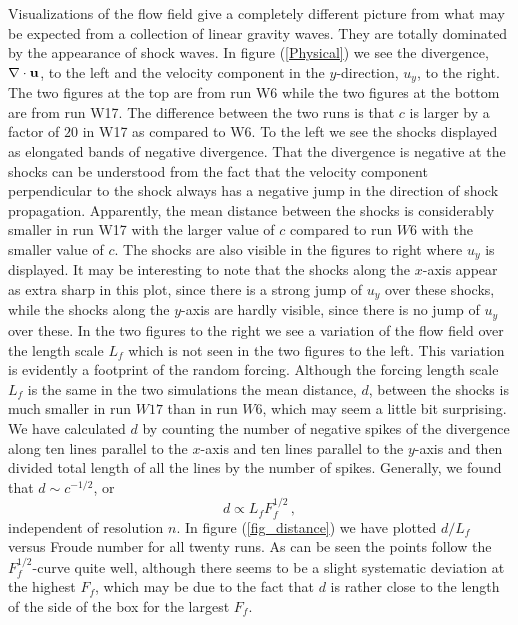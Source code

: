 Visualizations of the flow field give a completely different picture from what
may be expected from a collection of linear gravity waves. They are totally
dominated by the appearance of shock waves. In figure (\ref{Physical}) we see
the divergence, $ \nabla \cdot {\bf u} $, to the left and the velocity
component in the $ y $-direction, $ u_y $, to the right. The two figures at the
top are from run W6 while the two figures at the bottom are from run W17. The
difference between the two runs is that $ c $ is larger by a factor of $ 20 $
in W17 as compared to W6. To the left we see the shocks displayed as elongated
bands of negative divergence. That the divergence is negative at the shocks can
be understood from the fact that the velocity component perpendicular to the
shock always has a negative jump in the direction of shock propagation.
Apparently, the mean distance between the shocks is considerably smaller in run
W17 with the larger value of $ c $ compared to run $ W6 $ with the smaller
value of $ c $. The shocks are also visible in the figures to right where $ u_y
$ is displayed. It may be interesting to note that the shocks along the $ x
$-axis appear as extra sharp in this plot, since there is a strong jump of $
u_{y} $ over these shocks, while the shocks along the $ y $-axis are hardly
visible, since there is no jump of $ u_{y} $ over these. In the two figures to
the right we see a variation of the flow field over the length scale $ L_f $
which is not seen in the two figures to the left. This variation is evidently a
footprint of the random forcing. Although the forcing length scale $ L_f $ is
the same in the two simulations the mean distance, $ d $, between the shocks is
much smaller in run $ W17 $ than in run $ W6 $, which may seem a little bit
surprising. We have calculated $ d $ by counting the number of negative spikes
of the divergence along ten lines parallel to the $ x $-axis and ten lines
parallel to the $ y $-axis and then divided total length of all the lines by
the number of spikes. Generally, we found that $ d \sim c^{-1/2} $, or
\begin{equation} \label{MeanDistance}
d \propto L_f F_f ^{1/2} \, ,
\end{equation}
independent of resolution $ n $. In figure (\ref{fig_distance}) we have plotted
$ d/L_f $ versus Froude number for all twenty runs. As can be seen the points
follow the $ F_f^{1/2} $-curve quite well, although there seems to be a slight
systematic deviation at the highest $ F_f $, which may be due to the fact that
$ d $ is rather close to the length of the side of the box for the largest $
F_f $.

